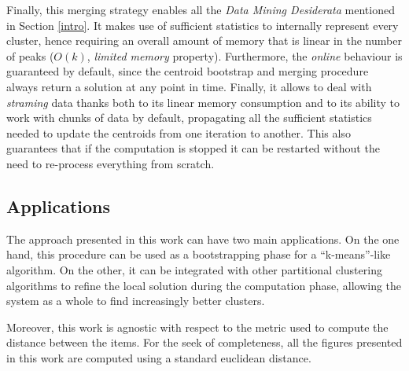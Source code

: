 Finally, this merging strategy enables all the \emph{Data Mining Desiderata} mentioned in Section
\ref{intro}. It makes use of sufficient statistics to internally represent every cluster, hence
requiring an overall amount of memory that is linear in the number of peaks ($O(k)$, \emph{limited memory}
property). Furthermore, the \emph{online} behaviour is guaranteed by default, since the centroid
bootstrap and merging procedure always return a solution at any point in time. Finally, it allows
to deal with \emph{straming} data thanks both to its linear memory consumption and to its ability to
work with chunks of data by default, propagating all the sufficient statistics needed to update the
centroids from one iteration to another. This also guarantees that if the computation is stopped
it can be restarted without the need to re-process everything from scratch.


\subsection{Applications}
The approach presented in this work can have two main applications. On the one hand,
this procedure can be used as a bootstrapping phase for a  ``k-means''-like algorithm.
On the other, it can be integrated with other partitional clustering algorithms to
refine the local solution during the computation phase, allowing the system as a
whole to find increasingly better clusters.

Moreover, this work is agnostic with respect
to the metric used to compute the distance between the items. For the seek of
completeness, all the figures presented in this work are computed using a
standard euclidean distance.
